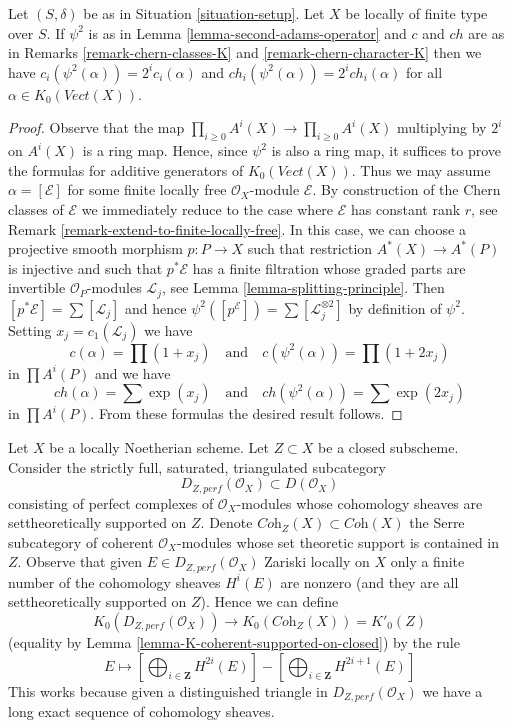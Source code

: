 \begin{lemma}
\label{lemma-adams-and-chern}
Let $(S, \delta)$ be as in Situation \ref{situation-setup}.
Let $X$ be locally of finite type over $S$. If $\psi^2$ is
as in Lemma \ref{lemma-second-adams-operator} and $c$ and $ch$ are as in
Remarks \ref{remark-chern-classes-K} and \ref{remark-chern-character-K}
then we have $c_i(\psi^2(\alpha)) = 2^i c_i(\alpha)$ and
$ch_i(\psi^2(\alpha)) = 2^i ch_i(\alpha)$
for all $\alpha \in K_0(\textit{Vect}(X))$.
\end{lemma}

\begin{proof}
Observe that the map $\prod_{i \geq 0} A^i(X) \to \prod_{i \geq 0} A^i(X)$
multiplying by $2^i$ on $A^i(X)$ is a ring map. Hence, since $\psi^2$
is also a ring map, it suffices to prove the formulas for additive generators
of $K_0(\textit{Vect}(X))$. Thus we may assume $\alpha = [\mathcal{E}]$
for some finite locally free $\mathcal{O}_X$-module $\mathcal{E}$.
By construction of the Chern classes of $\mathcal{E}$ we immediately
reduce to the case where $\mathcal{E}$ has constant rank $r$, see
Remark \ref{remark-extend-to-finite-locally-free}.
In this case, we can choose a projective smooth morphism $p : P \to X$
such that restriction $A^*(X) \to A^*(P)$ is injective
and such that $p^*\mathcal{E}$ has a finite filtration whose
graded parts are invertible $\mathcal{O}_P$-modules $\mathcal{L}_j$, see
Lemma \ref{lemma-splitting-principle}. Then
$[p^*\mathcal{E}] = \sum [\mathcal{L}_j]$ and hence
$\psi^2([p^\mathcal{E}]) = \sum [\mathcal{L}_j^{\otimes 2}]$
by definition of $\psi^2$. Setting $x_j  = c_1(\mathcal{L}_j)$
we have
$$
c(\alpha) = \prod (1 + x_j)
\quad\text{and}\quad
c(\psi^2(\alpha)) = \prod (1 + 2 x_j)
$$
in $\prod A^i(P)$ and we have
$$
ch(\alpha) = \sum \exp(x_j)
\quad\text{and}\quad
ch(\psi^2(\alpha)) = \sum \exp(2 x_j)
$$
in $\prod A^i(P)$. From these formulas the desired result follows.
\end{proof}

\begin{remark}
\label{remark-perf-Z-cohomology-K}
Let $X$ be a locally Noetherian scheme.
Let $Z \subset X$ be a closed subscheme. Consider the strictly
full, saturated, triangulated subcategory
$$
D_{Z, perf}(\mathcal{O}_X) \subset D(\mathcal{O}_X)
$$
consisting of perfect complexes of $\mathcal{O}_X$-modules
whose cohomology sheaves are settheoretically supported on $Z$.
Denote $\textit{Coh}_Z(X) \subset \textit{Coh}(X)$
the Serre subcategory of coherent $\mathcal{O}_X$-modules whose set theoretic
support is contained in $Z$. Observe that given
$E \in D_{Z, perf}(\mathcal{O}_X)$ Zariski locally on $X$
only a finite number of the cohomology sheaves $H^i(E)$ are nonzero
(and they are all settheoretically supported on $Z$).
Hence we can define
$$
K_0(D_{Z, perf}(\mathcal{O}_X))
\longrightarrow
K_0(\textit{Coh}_Z(X)) = K'_0(Z)
$$
(equality by Lemma \ref{lemma-K-coherent-supported-on-closed}) by the rule
$$
E \longmapsto
[\bigoplus\nolimits_{i \in \mathbf{Z}} H^{2i}(E)] -
[\bigoplus\nolimits_{i \in \mathbf{Z}} H^{2i + 1}(E)]
$$
This works because given a distinguished triangle in
$D_{Z, perf}(\mathcal{O}_X)$ we have a long exact sequence of
cohomology sheaves.
\end{remark}

